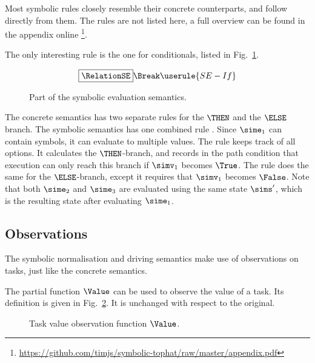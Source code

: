 
Most symbolic rules closely resemble their concrete counterparts, and follow directly from them.
The rules are not listed here, a full overview can be found in the appendix online \footnote{\url{https://github.com/timjs/symbolic-tophat/raw/master/appendix.pdf}}.

The only interesting rule is the one for conditionals, listed in Fig.~\ref{fig:eval}.
\begin{figure}[ht]
  \small
  \begin{gather*}
    \boxed{\RelationSE} \Break
    \userule{SE-If}
  \end{gather*}
  \caption{Part of the symbolic evaluation semantics.}
  \label{fig:eval}
\end{figure}
The concrete semantics has two separate rules for the $\THEN$ and the $\ELSE$ branch.
The symbolic semantics has one combined rule .
Since $\sime_1$ can contain symbols, it can evaluate to multiple values.
The rule keeps track of all options.
It calculates the $\THEN$-branch, and records in the path condition that execution can only reach this branch if $\simv_1$ becomes $\True$.
The rule does the same for the $\ELSE$-branch, except it requires that $\simv_1$ becomes $\False$.
Note that both $\sime_2$ and $\sime_3$ are evaluated using the same state $\sims'$,
which is the resulting state after evaluating $\sime_1$.



\subsection{Observations}
\label{subsec:observations}

The symbolic normalisation and driving semantics make use of observations on tasks, just like the concrete semantics.

The partial function $\Value$ can be used to observe the value of a task.
Its definition is given in Fig.~\ref{fig:value}.
It is unchanged with respect to the original.

\begin{figure}[ht]
  \small
  \begin{center}
  \end{center}
  \caption{Task value observation function $\Value$.}
  \label{fig:value}
\end{figure}

